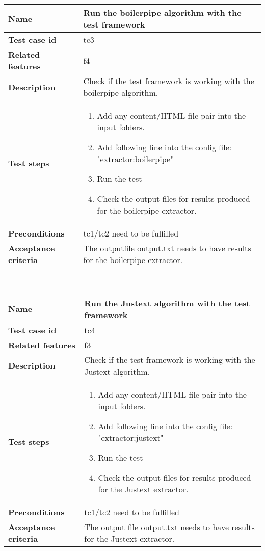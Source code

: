 	\begin{tabular}{ | p{3.5cm} | p{12cm} |}
	\hline
	\textbf{Name} 					&  Run the boilerpipe algorithm with the test framework\\ 	\hline
	\textbf{Test case id} 			& tc3 						\\ 	\hline
	\textbf{Related features}		& f4 						\\ 	\hline
	\textbf{Description} 			& Check if the test framework is working with the boilerpipe algorithm.	\\ 	\hline
	\textbf{Test steps} 			& 	\begin{enumerate}
											\item{Add any content/HTML file pair into the input folders.}
											\item{Add following line into the config file: "extractor:boilerpipe"}
											\item{Run the test}
											\item{Check the output files for results produced for the boilerpipe extractor.}
										\end{enumerate}
																\\ 	\hline
	\textbf{Preconditions} 			& tc1/tc2 need to be fulfilled 							\\ 	\hline
	\textbf{Acceptance criteria} 	& The outputfile output.txt needs to have results for the boilerpipe extractor.\\ 	\hline
	\end{tabular} \\



	\begin{tabular}{ | p{3.5cm} | p{12cm} |}
	\hline
	\textbf{Name} 					&  Run the Justext algorithm with the test framework\\ 	\hline
	\textbf{Test case id} 			& tc4 						\\ 	\hline
	\textbf{Related features}		& f3						\\ 	\hline
	\textbf{Description} 			& Check if the test framework is working with the Justext algorithm.	\\ 	\hline
	\textbf{Test steps} 			& 	\begin{enumerate}
											\item{Add any content/HTML file pair into the input folders.}
											\item{Add following line into the config file: "extractor:justext"}
											\item{Run the test}
											\item{Check the output files for results produced for the Justext extractor.}
										\end{enumerate}
																\\ 	\hline
	\textbf{Preconditions} 			& tc1/tc2 need to be fulfilled 							\\ 	\hline
	\textbf{Acceptance criteria} 	& The output file output.txt needs to have results for the Justext extractor.\\ 	\hline
	\end{tabular} \\

